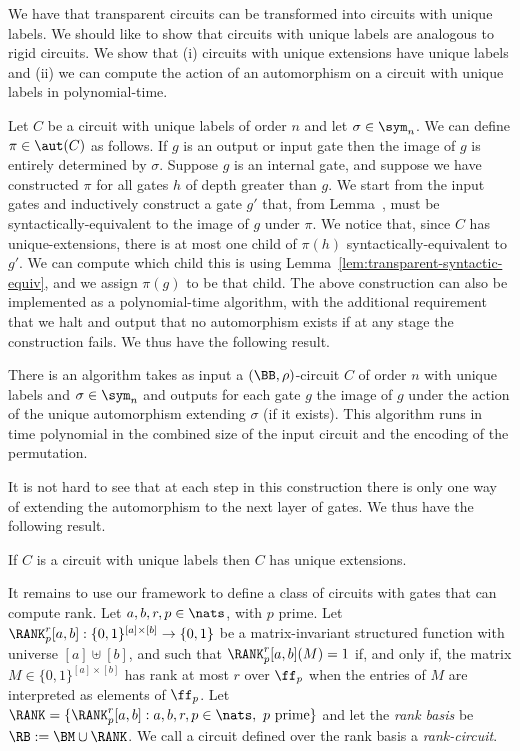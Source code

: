 \documentclass[a4paper,UKenglish]{lipics-v2018}
\begin{document}
We have that transparent circuits can be transformed into circuits with unique
labels. We should like to show that circuits with unique labels are analogous to
rigid circuits. We show that (i) circuits with unique extensions have unique
labels and (ii) we can compute the action of an automorphism on a circuit with
unique labels in polynomial-time.

Let $C$ be a circuit with unique labels of order $n$ and let $\sigma \in
\sym_n$. We can define $\pi \in \aut(C)$ as follows. If $g$ is an output or
input gate then the image of $g$ is entirely determined by $\sigma$. Suppose $g$
is an internal gate, and suppose we have constructed $\pi$ for all gates $h$ of
depth greater than $g$. We start from the input gates and inductively construct
a gate $g'$ that, from
Lemma~\cite{lem:permutation-extending-syntactic-equivalence}, must be
syntactically-equivalent to the image of $g$ under $\pi$. We notice that, since
$C$ has unique-extensions, there is at most one child of $ \pi(h)$
syntactically-equivalent to $g'$. We can compute which child this is using
Lemma~\ref{lem:transparent-syntactic-equiv}, and we assign $\pi(g)$ to be that
child. The above construction can also be implemented as a polynomial-time
algorithm, with the additional requirement that we halt and output that no
automorphism exists if at any stage the construction fails. We thus have the
following result.

\begin{lemma}
  There is an algorithm takes as input a $(\BB, \rho)$-circuit $C$ of order $n$
  with unique labels and $\sigma \in \sym_n$ and outputs for each gate $g$ the
  image of $g$ under the action of the unique automorphism extending $\sigma$
  (if it exists). This algorithm runs in time polynomial in the combined size of
  the input circuit and the encoding of the permutation.
  \label{lem:compute-automorphisms}
\end{lemma}

It is not hard to see that at each step in this construction there is only one
way of extending the automorphism to the next layer of gates. We thus have the
following result.

\begin{lemma}
  If $C$ is a circuit with unique labels then $C$ has unique extensions.
  \label{lem:unique-labels-unique-extensions}
\end{lemma}

It remains to use our framework to define a class of circuits with gates that
can compute rank. Let $a, b, r, p \in \nats$, with $p$ prime. Let
$\RANK^r_p[a,b] : \{0,1\}^{[a] \times [b]} \rightarrow \{0,1\}$ be a
matrix-invariant structured function with universe $[a] \uplus [b]$, and such
that $\RANK^r_p[a,b](M) = 1$ if, and only if, the matrix $M \in \{0,1\}^{[a]
  \times [b]}$ has rank at most $r$ over $\ff_p$ when the entries of $M$ are
interpreted as elements of $\ff_p$. Let $\RANK = \{\RANK^{r}_p[a,b] : a, b, r, p
\in \nats, \text{ $p$ prime}\}$ and let the \emph{rank basis} be $\RB := \BM
\cup \RANK$. We call a circuit defined over the rank basis a
\emph{rank-circuit}.
\end{document}
